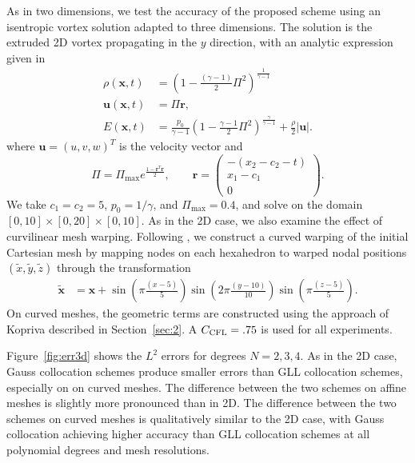 \documentclass[review,onefignum,onetabnum,final]{siamart171218}
\renewcommand{\tilde}{\widetilde}
\newcommand{\LRp}[1]{\left( #1 \right)}
\newcommand{\LRb}[1]{\left| #1 \right|}
\begin{document}
As in two dimensions, we test the accuracy of the proposed scheme using an isentropic vortex solution adapted to three dimensions.  The solution is the extruded 2D vortex propagating in the $y$ direction, with an analytic expression given in \cite{williams2013nodal}
\begin{align*}
\rho(\bm{x},t) &= \LRp{1-\frac{(\gamma-1)}{2}\Pi^2}^{\frac{1}{\gamma-1}}\\
\bm{u}(\bm{x},t) &= \Pi \bm{r}, \\
E(\bm{x},t) &= \frac{p_0}{\gamma-1}\LRp{1-\frac{\gamma-1}{2}\Pi^2}^{\frac{\gamma}{\gamma-1}} + \frac{\rho}{2}\LRb{\bm{u}}.
\end{align*}
where $\bm{u} = (u,v,w)^T$ is the velocity vector and %
\[
\Pi = \Pi_{\max}e^{\frac{1-\bm{r}^T\bm{r}}{2}}, \qquad \bm{r} = \begin{pmatrix}
-(x_2-c_2-t)\\
x_1-c_1\\
0
\end{pmatrix}.
\]
We take $c_1 = c_2 = 5$, $p_0 = {1}/{\gamma}$, and $\Pi_{\max} = 0.4$, and solve on the domain $[0,10]\times [0,20]\times [0,10]$.  As in the 2D case, we also examine the effect of curvilinear mesh warping.  Following \cite{chan2018discretely}, we construct a curved warping of the initial Cartesian mesh by mapping nodes on each hexahedron to warped nodal positions $(\tilde{x},\tilde{y},\tilde{z})$ through the transformation
\begin{align*}
\tilde{\bm{x}} &= \bm{x} + \sin\LRp{\pi \frac{(x-5)}{5}}\sin\LRp{2\pi \frac{(y-10)}{10}}\sin\LRp{\pi \frac{(z-5)}{5}}.
\end{align*} 
On curved meshes, the geometric terms are constructed using the approach of Kopriva described in Section~\ref{sec:2}.  A $C_{\rm CFL} = .75$ is used for all experiments.  

Figure~\ref{fig:err3d} shows the $L^2$ errors for degrees $N = 2, 3, 4$.  As in the 2D case, Gauss collocation schemes produce smaller errors than GLL collocation schemes, especially on on curved meshes.  The difference between the two schemes on affine meshes is slightly more pronounced than in 2D.  The difference between the two schemes on curved meshes is qualitatively similar to the 2D case, with Gauss collocation achieving higher accuracy than GLL collocation schemes at all polynomial degrees and mesh resolutions.  %
\end{document}
